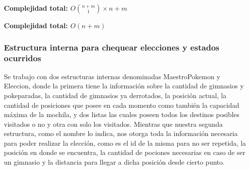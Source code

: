 \begin{algorithm}[H]
\textbf{\hfill Complejidad total: $O\binom{n+m}{1} \times n+m$}\\ 
\end{algorithm}



\begin{algorithm}[H]
\textbf{\hfill Complejidad total: $O(n+m)$}\\ 
\end{algorithm}



\subsubsection{Estructura interna para chequear elecciones y estados ocurridos}

Se trabajo con dos estructuras internas denominadas MaestroPokemon y Eleccion, donde la primera tiene la informaci\'on sobre la cantidad de gimnasios y pokeparadas, la cantidad de gimnasios ya derrotados, la posici\'on actual, la cantidad de posiciones que posee en cada momento como tambi\'en la capacidad m\'axima de la mochila, y dos listas las cuales poseen todos los destinos posibles visitados o no y otra con solo los visitados.
Mientras que nuestra segunda estructura, como el nombre lo indica, nos otorga toda la informaci\'on necesaria para poder realizar la elecci\'on, como es el id de la misma para no ser repetida, la posici\'on en donde se encuentra, la cantidad de pociones necesarias en caso de ser un gimnasio y la distancia para llegar a dicha posici\'on desde cierto punto.

